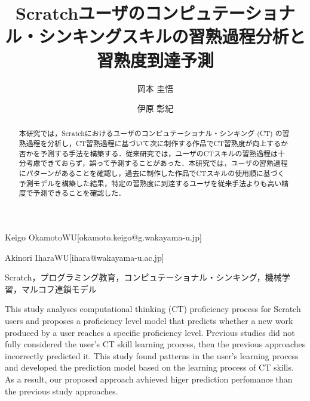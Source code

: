 \documentclass[submit]{ipsj}
\begin{document}
\title{Scratchユーザのコンピュテーショナル・シンキングスキルの習熟過程分析と習熟度到達予測}






\author{岡本 圭悟}{Keigo Okamoto}{WU}[okamoto.keigo@g.wakayama-u.jp]
\author{伊原 彰紀}{Akinori Ihara}{WU}[ihara@wakayama-u.ac.jp]


\begin{abstract}
本研究では，Scratchにおけるユーザのコンピュテーショナル・シンキング (CT) の習熟過程を分析し，CT習熟過程に基づいて次に制作する作品でCT習熟度が向上するか否かを予測する手法を構築する．従来研究では，ユーザのCTスキルの習熟過程は十分考慮できておらず，誤って予測することがあった．本研究では，ユーザの習熟過程にパターンがあることを確認し，過去に制作した作品でCTスキルの使用順に基づく予測モデルを構築した結果，特定の習熟度に到達するユーザを従来手法よりも高い精度で予測できることを確認した．
\end{abstract}

\begin{jkeyword}
Scratch，プログラミング教育，コンピュテーショナル・シンキング，機械学習，マルコフ連鎖モデル
\end{jkeyword}

\begin{eabstract}
This study analyses computational thinking (CT) proficiency process for Scratch users and proposes a proficiency level model that predicts
whether a new work produced by a user reaches a specific proficiency level. Previous studies did not fully considered the user's CT skill learning process, then the previous approaches incorrectly predicted it. This study found patterns in the user's learning process and developed the prediction model based on the learning process of CT skills. As a result, our proposed approach avhieved higer prediction perfomance than the previous study approaches.
\end{eabstract}
\end{document}
